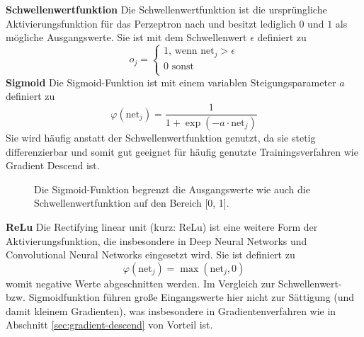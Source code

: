 		
		\textbf{Schwellenwertfunktion}
		Die Schwellenwertfunktion ist die ursprüngliche Aktivierungsfunktion für das Perzeptron nach \cite{McCulloch1943} und besitzt lediglich $0$ und $1$ als mögliche Ausgangswerte. Sie ist mit dem Schwellenwert $\epsilon$ definiert zu 
		\begin{equation}
		\label{eq:acti_sw}
		o_j = \left\{
		\begin{array}{ll}
		1\text{, wenn } \text{net}_j > \epsilon \\
		0 \text{ sonst}\\
		\end{array}
		\right.
		\end{equation}
		\textbf{Sigmoid}
			Die Sigmoid-Funktion ist mit einem variablen Steigungsparameter $a$ definiert zu 
			\begin{equation}
			\varphi\left(\text{net}_j\right) = \frac{1}{1+\exp(-a \cdot \text{net}_j)}
			\end{equation}
			Sie wird häufig anstatt der Schwellenwertfunktion genutzt, da sie stetig differenzierbar und somit gut geeignet für häufig genutzte Trainingsverfahren wie Gradient Descend ist.\\
			\begin{figure}[ht]
				\centering
				\caption{Die Sigmoid-Funktion begrenzt die Ausgangswerte wie auch die Schwellenwertfunktion auf den Bereich [0, 1].}
				\label{fig:sigmoid_plot}
			\end{figure}


		\textbf{ReLu}
		Die Rectifying linear unit (kurz: ReLu) ist eine weitere Form der Aktivierungsfunktion, die insbesondere in Deep Neural Networks und Convolutional Neural Networks eingesetzt wird. Sie ist definiert zu
		\begin{equation}
			\label{eq:relu_def}
			\varphi(\text{net}_j) = \max(\text{net}_j, 0)
		\end{equation}
		womit negative Werte abgeschnitten werden. Im Vergleich zur Schwellenwert- bzw. Sigmoidfunktion führen große Eingangswerte hier nicht zur Sättigung (und damit kleinem Gradienten), was insbesondere in Gradientenverfahren wie in Abschnitt \ref{sec:gradient-descend} von Vorteil ist. \\
		
